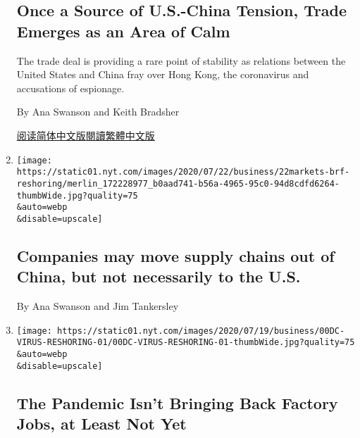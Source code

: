 \begin{enumerate}
  \hypertarget{once-a-source-of-us-china-tension-trade-emerges-as-an-area-of-calm}{%
  \subsection{Once a Source of U.S.-China Tension, Trade Emerges as an
  Area of
  Calm}\label{once-a-source-of-us-china-tension-trade-emerges-as-an-area-of-calm}}

  The trade deal is providing a rare point of stability as relations
  between the United States and China fray over Hong Kong, the
  coronavirus and accusations of espionage.

  By Ana Swanson and Keith Bradsher

  \href{https://cn.nytimes.com/business/20200727/us-china-trade-diplomacy/}{阅读简体中文版}\href{https://cn.nytimes.com/business/20200727/us-china-trade-diplomacy/zh-hant/}{閱讀繁體中文版}
\item
  \href{/2020/07/22/business/companies-may-move-supply-chains-out-of-china-but-not-necessarily-to-the-us.html}{}

  \texttt{[image: https://static01.nyt.com/images/2020/07/22/business/22markets-brf-reshoring/merlin\_172228977\_b0aad741-b56a-4965-95c0-94d8cdfd6264-thumbWide.jpg?quality=75\\\&auto=webp\\\&disable=upscale]}

  \hypertarget{companies-may-move-supply-chains-out-of-china-but-not-necessarily-to-the-us}{%
  \subsection{Companies may move supply chains out of China, but not
  necessarily to the
  U.S.}\label{companies-may-move-supply-chains-out-of-china-but-not-necessarily-to-the-us}}

  By Ana Swanson and Jim Tankersley
\item
  \href{/2020/07/22/business/economy/coronavirus-globalization-jobs-supply-chain-china.html}{}

  \texttt{[image: https://static01.nyt.com/images/2020/07/19/business/00DC-VIRUS-RESHORING-01/00DC-VIRUS-RESHORING-01-thumbWide.jpg?quality=75\\\&auto=webp\\\&disable=upscale]}

  \hypertarget{the-pandemic-isnt-bringing-back-factory-jobs-at-least-not-yet}{%
  \subsection{The Pandemic Isn't Bringing Back Factory Jobs, at Least
  Not
  Yet}\label{the-pandemic-isnt-bringing-back-factory-jobs-at-least-not-yet}}


\end{enumerate}
